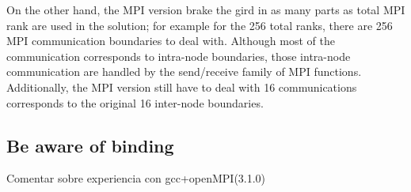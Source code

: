 On the other hand, the MPI version brake the gird in as many parts as total MPI rank are used in the solution; for example for the 256 total ranks, there are 256 MPI communication boundaries to deal with. Although most of the communication corresponds to intra-node boundaries, those intra-node communication are handled by the send/receive family of MPI functions. Additionally, the MPI version still have to deal with 16 communications corresponds to the original 16 inter-node boundaries.


\subsection*{Be aware of binding}

Comentar sobre experiencia con gcc+openMPI(3.1.0)





